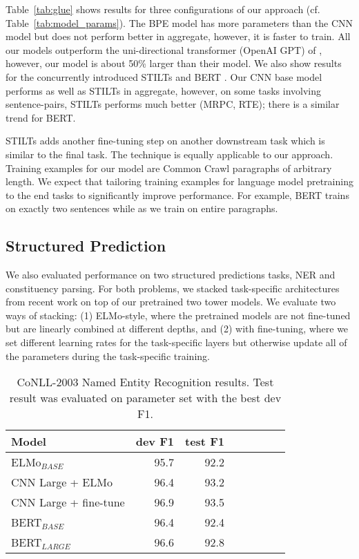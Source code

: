 \documentclass[11pt,a4paper]{article}
\begin{document}
Table~\ref{tab:glue} shows results for three configurations of our approach (cf. Table~\ref{tab:model_params}). 
The BPE model has more parameters than the CNN model but does not perform better in aggregate, however, it is faster to train.
All our models outperform the uni-directional transformer (OpenAI GPT) of \citet{radford2018unsup}, however, our model is about 50\% larger than their model.
We also show results for the concurrently introduced STILTs \citep{phang2018stilts} and BERT \citep{devlin2018bert}.
Our CNN base model performs as well as STILTs in aggregate, however, on some tasks involving sentence-pairs, STILTs performs much better (MRPC, RTE); there is a similar trend for BERT.

STILTs adds another fine-tuning step on another downstream task which is similar to the final task.
The technique is equally applicable to our approach.
Training examples for our model are  Common Crawl paragraphs of arbitrary length.
We expect that tailoring training examples for language model pretraining to the end tasks to significantly improve performance. 
For example, BERT trains on exactly two sentences while as we train on entire paragraphs.


\subsection{Structured Prediction}

We also evaluated performance on two structured predictions tasks, NER and constituency parsing. For both problems, we stacked task-specific architectures from recent work on top of our pretrained two tower models. We evaluate two ways of stacking: (1) ELMo-style, where the pretrained models are not fine-tuned but are linearly combined at different depths, and (2) with fine-tuning, where we set different learning rates for the task-specific layers but otherwise update all of the parameters during the task-specific training. 


\begin{table}[t]
\centering
\begin{tabular}{lrrrrrcr}
\toprule
\bf Model & \bf dev F1 & \bf test F1 \\ \midrule
ELMo$_{BASE}$ &  95.7 & 92.2  \\ \midrule
CNN Large + ELMo & 96.4 & 93.2\\ 
CNN Large + fine-tune & 96.9 &93.5 \\ \midrule
BERT$_{BASE}$ & 96.4 & 92.4  \\
BERT$_{LARGE}$ & 96.6 & 92.8 \\
\bottomrule
\end{tabular}
\caption{ CoNLL-2003 Named Entity Recognition results. Test result was evaluated on parameter set with the best dev F1.}
\label{tab:NER_results}
\end{table}
\end{document}

